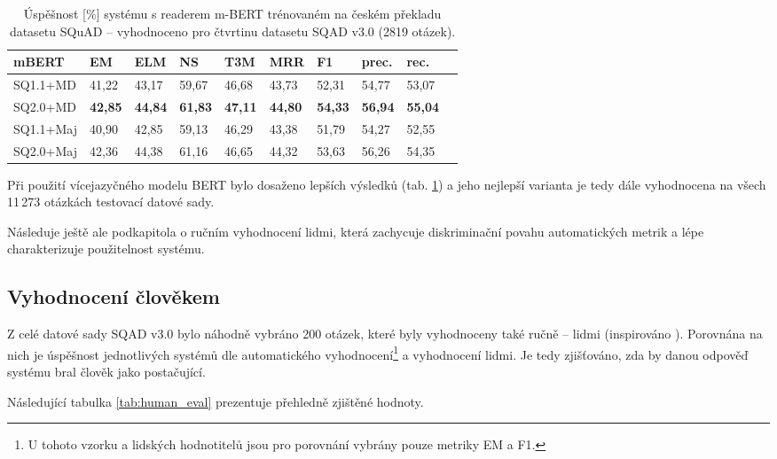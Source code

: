 \begin{table}[H]
    \centering
    \begin{tabular}{|l||l|l|l|l|l|l|l|l|l|}
        \hline
        \textbf{mBERT}  & \textbf{EM}   & ELM       & NS        & T3M       & MRR       & \textbf{F1}   & prec.         & rec.      \\ \hline\hline
            SQ1.1+MD    & 41,22         & 43,17     & 59,67     & 46,68     & 43,73     & 52,31         & 54,77         & 53,07     \\ \hline
            SQ2.0+MD    & \textbf{42,85}&\textbf{44,84}&\textbf{61,83}&\textbf{47,11}&\textbf{44,80}&\textbf{54,33}&\textbf{56,94}&\textbf{55,04}\\ \hline
            SQ1.1+Maj   & 40,90         & 42,85     & 59,13     & 46,29     & 43,38     & 51,79         & 54,27         & 52,55         \\ \hline
            SQ2.0+Maj   & 42,36         & 44,38     & 61,16     & 46,65     & 44,32     & 53,63         & 56,26         & 54,35     \\ \hline
    \end{tabular}
    \caption{Úspěšnost [\%] systému s readerem m-BERT trénovaném na českém překladu datasetu SQuAD -- vyhodnoceno pro čtvrtinu datasetu SQAD v3.0 (2819 otázek).}
    \label{tab:system_eval_mbert}
\end{table}

Při použití vícejazyčného modelu BERT bylo dosaženo lepších výsledků (tab. \ref{tab:system_eval_mbert}) a jeho nejlepší varianta je tedy dále vyhodnocena na všech 11\,273 otázkách testovací datové sady.\par
Následuje ještě ale podkapitola o ručním vyhodnocení lidmi, která zachycuje diskriminační povahu automatických metrik a lépe charakterizuje použitelnost systému.\pagebreak

\subsection{Vyhodnocení člověkem}
\label{human_eval}
Z celé datové sady SQAD v3.0 bylo náhodně vybráno 200 otázek, které byly vyhodnoceny také ručně -- lidmi (inspirováno \cite{min2021neurips}). Porovnána na nich je úspěšnost jednotlivých systémů dle automatického vyhodnocení\footnote{U tohoto vzorku a lidských hodnotitelů jsou pro porovnání vybrány pouze metriky EM a F1.} a vyhodnocení lidmi. Je tedy zjišťováno, zda by danou odpověď systému bral člověk jako postačující.\par
Následující tabulka \ref{tab:human_eval} prezentuje přehledně zjištěné hodnoty.

